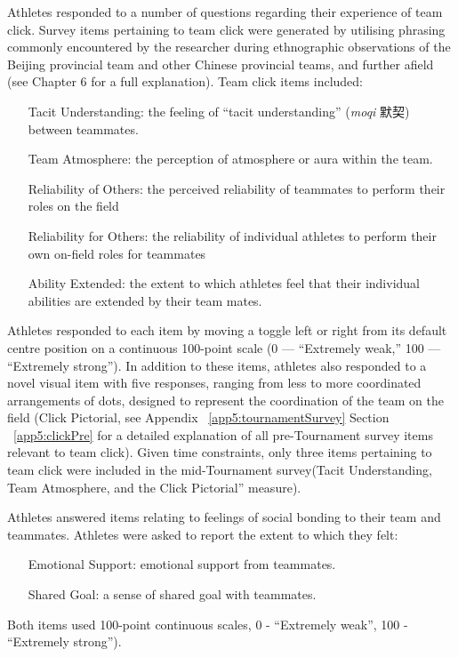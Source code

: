 Athletes responded to a number of questions regarding their experience of team click. Survey items pertaining to team click were generated by utilising phrasing commonly encountered by the researcher during ethnographic observations of the Beijing provincial team and other Chinese provincial teams, and further afield (see Chapter 6 for a full explanation).  Team click items included:

\begin{itemize}
  \item[Tacit Understanding:] the feeling of ``tacit understanding'' (\textit{moqi} 默契) between teammates.
  \item[Team Atmosphere:] the perception of atmosphere or aura within the team.
  \item[Reliability of Others:] the perceived reliability of teammates to perform their roles on the field
  \item[Reliability for Others:] the reliability of individual athletes to perform their own on-field roles for teammates
  \item[Ability Extended:]the extent to which athletes feel that their individual abilities are extended by their team mates.
\end{itemize}

Athletes responded to each item by moving a toggle left or right from its default centre position on a continuous 100-point scale (0 --- ``Extremely weak,'' 100 --- ``Extremely strong''). In addition to these items, athletes also responded to a novel visual item with five responses, ranging from less to more coordinated arrangements of dots, designed to represent the coordination of the team on the field (Click Pictorial, see Appendix ~\ref{app5:tournamentSurvey} Section ~\ref{app5:clickPre} for a detailed explanation of all pre-Tournament survey items relevant to team click).  Given time constraints, only three items pertaining to team click were included in the mid-Tournament survey(Tacit Understanding, Team Atmosphere, and the Click Pictorial'' measure).

Athletes answered items relating to feelings of social bonding to their team and teammates.  Athletes were asked to report the extent to which they felt:
\begin{itemize}
  \item[Emotional Support:] emotional support from teammates.
  \item[Shared Goal:] a sense of shared goal with teammates.
\end{itemize}
Both items used 100-point continuous scales, 0 - ``Extremely weak'', 100 - ``Extremely strong'').

